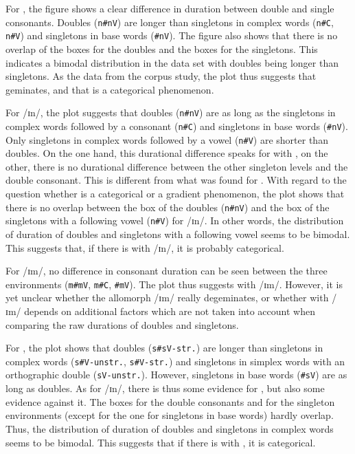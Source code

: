 For ,  the figure shows a clear difference in duration between double and single consonants. Doubles (\texttt{n\#nV}) are longer than singletons in complex words (\texttt{n\#C}, \texttt{n\#V}) and singletons in base words (\texttt{\#nV}). 
  The figure also shows that there is no overlap of the boxes for the doubles and the boxes for the singletons. This indicates a bimodal distribution in the data set with doubles being longer than singletons. 
As the data from the corpus study, the  plot thus suggests that  geminates, and that  is a categorical phenomenon. 



For /ɪn/, the plot suggests that doubles (\texttt{n\#nV}) are as long as the singletons in complex words followed by a consonant (\texttt{n\#C}) and singletons in base words (\texttt{\#nV}). Only singletons in complex words followed by a vowel (\texttt{n\#V}) are shorter than doubles. 
On the one hand, this durational difference speaks for  with , on the other, there is no durational difference between the other singleton levels and the double consonant. This is different from what was found for .
With regard to the question whether  is a categorical or a gradient phenomenon, the plot shows that there is no overlap between the box of the doubles (\texttt{n\#nV}) and the box of the singletons with a following vowel (\texttt{n\#V}) for /ɪn/. In other words, the distribution of duration of doubles and singletons with a following vowel seems to be bimodal. This suggests that, if there is  with /ɪn/, it is probably categorical.

For /ɪm/, no difference in consonant duration can be seen between the three environments (\texttt{m\#mV}, \texttt{m\#C}, \texttt{\#mV}). The plot thus suggests  with /ɪm/. However, 
it is yet unclear whether the allomorph /ɪm/  really degeminates, or whether  with /ɪm/  depends on additional factors which are not taken into account when comparing the raw durations of doubles and singletons. \largerpage[-1]


For , the plot shows that doubles (\texttt{s\#sV-str.})  are longer than singletons in complex words (\texttt{s\#V-unstr.}, \texttt{s\#V-str.}) and singletons in simplex words with an orthographic double (\texttt{sV-unstr.}). However, singletons in base words (\texttt{\#sV}) are as long as doubles. 
As for /ɪn/, there is thus some evidence for , but also some evidence against it.  
The boxes for the double consonants and  for the singleton environments (except for the one for singletons in base words)  hardly overlap. Thus, the distribution of duration of doubles and singletons in complex words seems to be bimodal. This suggests that if there is  with , it is categorical.


